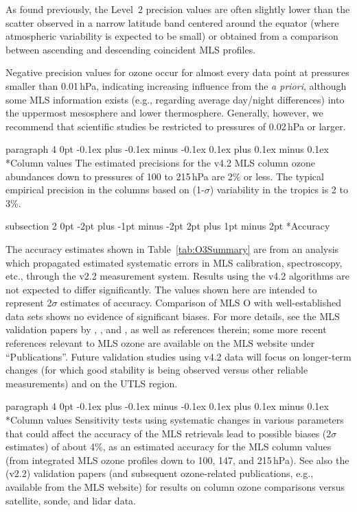 \documentclass[11pt,draft]{report}
\makeatletter
\renewcommand{\subsection}{\@startsection%
  {subsection}%
  {2}%
  {0pt}%
  {-2pt plus -1pt minus -2pt}%
  {2pt plus 1pt minus 2pt}%
  {\large\sffamily\fontseries{sb}\selectfont\flushleft\color{SectionColor}\figureversion{tabular}}}%
\renewcommand{\paragraph}{\@startsection%
  {paragraph}%
  {4}%
  {0pt}%
  {-0.1ex plus -0.1ex minus -0.1ex}%
  {0.1ex plus 0.1ex minus 0.1ex}%
  {\normalsize\sffamily\flushleft\color{SectionColor}\figureversion{tabular}}}%
\makeatother
\begin{document}
As found previously, the Level~2 precision values are often slightly lower than 
the scatter observed in a narrow latitude band centered 
around the equator (where atmospheric variability is expected to be small) or
obtained from a comparison between ascending and descending coincident
MLS profiles.
 
Negative precision values for ozone occur for almost every data
point at pressures smaller than 0.01\,hPa, indicating increasing
influence from the \emph{a priori}, although some MLS information exists
(e.g., regarding average day/night differences) into the uppermost
mesosphere and lower thermosphere.  Generally, however, we recommend
that scientific studies be restricted to pressures of 0.02\,hPa or
larger.
 
\paragraph*{Column values} The estimated precisions for the v4.2 MLS 
column ozone abundances down to pressures of 100 to 215\,hPa are 2\% or less.  
The typical empirical precision in the columns based on (1-$\sigma$)
variability in the tropics is 2 to 3\%.  
 
\subsection*{Accuracy}
 
The accuracy estimates shown in Table~\ref{tab:O3Summary} are from an
analysis which propagated estimated systematic errors in MLS
calibration, spectroscopy, etc., through the v2.2 measurement system.
Results using the v4.2 algorithms are not expected to differ
significantly.  The values shown here are intended to represent
2$\sigma$ estimates of accuracy.  Comparison of MLS O with
well-established data sets shows no evidence of significant biases.
For more
details, see the MLS validation papers by \citet{FroidevauxEtal08O3},
\citet{JiangYEtal07}, and \citet{LiveseyEtal08}, as well as references
therein; some more recent references relevant to MLS ozone are available
on the MLS website under ``Publications''.  Future validation studies
using v4.2 data will focus on longer-term changes (for which good
stability is being observed versus other reliable measurements) and on
the UTLS region.
 
\paragraph*{Column values}
Sensitivity tests using systematic changes in various parameters that
could affect the accuracy of the MLS retrievals lead to possible biases
($2\sigma$ estimates) of about 4\%, as an estimated accuracy for the MLS
column values (from integrated MLS ozone profiles down to 100, 147, and
215\,hPa).  See also the (v2.2) validation papers (and subsequent
ozone-related publications, e.g., available from the MLS website) for
results on column ozone comparisons versus satellite, sonde, and lidar
data.
 
\end{document}
